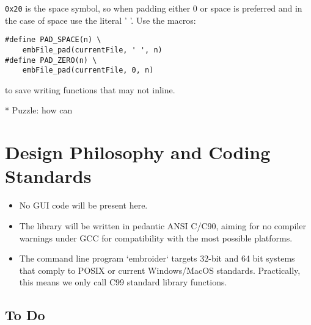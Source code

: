 \documentclass[onesize, a4paper]{refart}
\begin{document}
\texttt{0x20} is the space symbol, so when padding either 0 or space is preferred and in the case of space use the literal ' '. Use the macros:

\begin{verbatim}
#define PAD_SPACE(n) \
    embFile_pad(currentFile, ' ', n)
#define PAD_ZERO(n) \
    embFile_pad(currentFile, 0, n)
\end{verbatim}

to save writing functions that may not inline.

* Puzzle: how can 

\section{Design Philosophy and Coding Standards}

\begin{itemize} 
\item No GUI code will be present here.
\item The library will be written in pedantic ANSI C/C90, aiming for no compiler warnings under GCC for compatibility with the most possible platforms.
\item The command line program `embroider` targets 32-bit and 64 bit systems that comply to POSIX or current Windows/MacOS standards. Practically, this means we only call C99 standard library functions.
\end{itemize}

\subsection{To Do}
\end{document}
